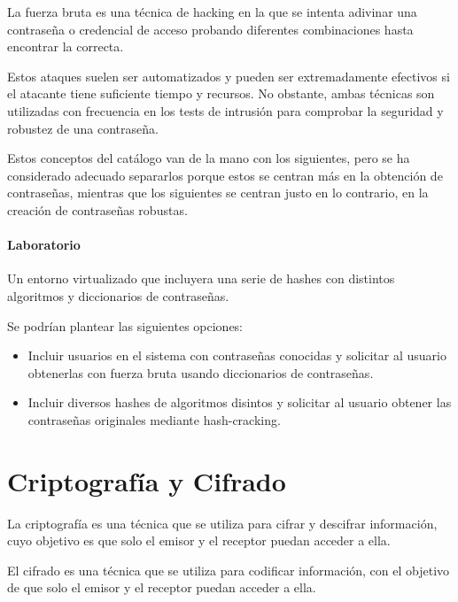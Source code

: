             La fuerza bruta es una técnica de hacking en la que se intenta adivinar una contraseña o credencial de acceso probando diferentes combinaciones hasta encontrar la correcta.
            
            Estos ataques suelen ser automatizados y pueden ser extremadamente efectivos si el atacante tiene suficiente tiempo y recursos. No obstante, ambas técnicas son utilizadas con frecuencia en los tests de intrusión para comprobar la seguridad y robustez de una contraseña.

            Estos conceptos del catálogo van de la mano con los siguientes, pero se ha considerado adecuado separarlos porque estos se centran más en la obtención de contraseñas, mientras que los siguientes se centran justo en lo contrario, en la creación de contraseñas robustas. 

            \paragraph{Laboratorio}

                Un entorno virtualizado que incluyera una serie de hashes con distintos algoritmos y diccionarios de contraseñas.

                Se podrían plantear las siguientes opciones:
                
                \begin{itemize}
                    \item Incluir usuarios en el sistema con contraseñas conocidas y solicitar al usuario obtenerlas con fuerza bruta usando diccionarios de contraseñas.
                    \item Incluir diversos hashes de algoritmos disintos y solicitar al usuario obtener las contraseñas originales mediante hash-cracking.
                \end{itemize}


        \section{Criptografía y Cifrado}

            La criptografía es una técnica que se utiliza para cifrar y descifrar información, cuyo objetivo es que solo el emisor y el receptor puedan acceder a ella.

            El cifrado es una técnica que se utiliza para codificar información, con el objetivo de que solo el emisor y el receptor puedan acceder a ella.

